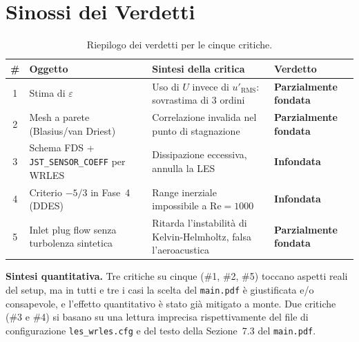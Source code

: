 \documentclass[11pt,a4paper]{article}
\newcommand{\Rey}{\mathrm{Re}}
\begin{document}
\tableofcontents
\newpage

\section{Sinossi dei Verdetti}
\label{sec:sinossi}

\begin{table}[H]
  \centering
  \caption{Riepilogo dei verdetti per le cinque critiche.}
  \label{tab:sinossi}
  \small
  \begin{tabularx}{\textwidth}{clX>{\centering\arraybackslash}p{3.0cm}}
    \toprule
    \rowcolor{tablehead}
    \textbf{\#} & \textbf{Oggetto} & \textbf{Sintesi della critica} & \textbf{Verdetto} \\
    \midrule
    1 & Stima di $\varepsilon$ & Uso di $U$ invece di $u'_{\mathrm{RMS}}$:
        sovrastima di 3 ordini & \textcolor{accentorange}{\bfseries Parzialmente fondata} \\
    2 & Mesh a parete (Blasius/van Driest) & Correlazione invalida
        nel punto di stagnazione & \textcolor{accentorange}{\bfseries Parzialmente fondata} \\
    3 & Schema FDS + \texttt{JST\_SENSOR\_COEFF} per WRLES & Dissipazione
        eccessiva, annulla la LES & \textcolor{accentgreen}{\bfseries Infondata} \\
    4 & Criterio $-5/3$ in Fase~4 (DDES) & Range inerziale
        impossibile a $\Rey=1000$ & \textcolor{accentgreen}{\bfseries Infondata} \\
    5 & Inlet plug flow senza turbolenza sintetica & Ritarda
        l'instabilità di Kelvin-Helmholtz, falsa l'aeroacustica & \textcolor{accentorange}{\bfseries Parzialmente fondata} \\
    \bottomrule
  \end{tabularx}
\end{table}

\textbf{Sintesi quantitativa.} Tre critiche su cinque (\#1, \#2, \#5) toccano
aspetti reali del setup, ma in tutti e tre i casi la scelta del
\texttt{main.pdf} è giustificata e/o consapevole, e l'effetto
quantitativo è stato già mitigato a monte. Due critiche (\#3 e
\#4) si basano su una lettura imprecisa rispettivamente del file
di configurazione \texttt{les\_wrles.cfg} e del testo della
Sezione~7.3 del \texttt{main.pdf}.

\end{document}

